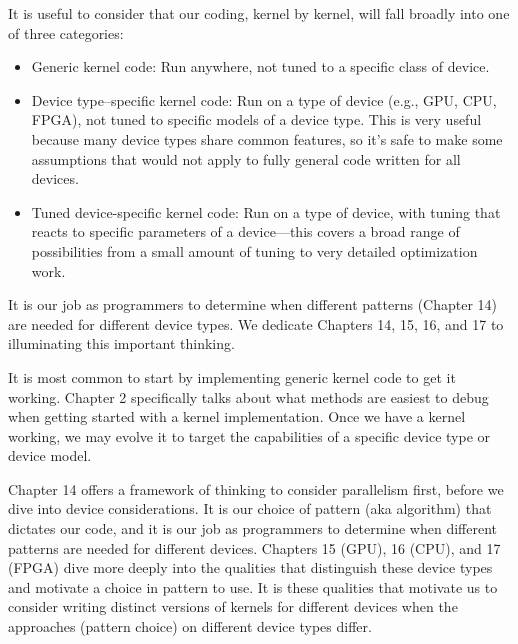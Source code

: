It is useful to consider that our coding, kernel by kernel, will fall broadly into one of three categories:\par

\begin{itemize}
	\item Generic kernel code: Run anywhere, not tuned to a specific class of device.
	\item Device type–specific kernel code: Run on a type of device (e.g., GPU, CPU, FPGA), not tuned to specific models of a device type. This is very useful because many device types share common features, so it's safe to make some assumptions that would not apply to fully general code written for all devices.
	\item Tuned device-specific kernel code: Run on a type of device, with tuning that reacts to specific parameters of a device—this covers a broad range of possibilities from a small amount of tuning to very detailed optimization work.
\end{itemize}

\begin{tcolorbox}[colback=red!5!white,colframe=red!75!black]
It is our job as programmers to determine when different patterns (Chapter 14) are needed for different device types. We dedicate Chapters 14, 15, 16, and 17 to illuminating this important thinking.
\end{tcolorbox}

It is most common to start by implementing generic kernel code to get it working. Chapter 2 specifically talks about what methods are easiest to debug when getting started with a kernel implementation. Once we have a kernel working, we may evolve it to target the capabilities of a specific device type or device model.\par

Chapter 14 offers a framework of thinking to consider parallelism first, before we dive into device considerations. It is our choice of pattern (aka algorithm) that dictates our code, and it is our job as programmers to determine when different patterns are needed for different devices. Chapters 15 (GPU), 16 (CPU), and 17 (FPGA) dive more deeply into the qualities that distinguish these device types and motivate a choice in pattern to use. It is these qualities that motivate us to consider writing distinct versions of kernels for different devices when the approaches (pattern choice) on different device types differ.\par

